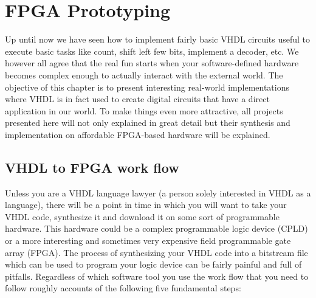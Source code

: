 \documentclass[13pt]{extreport}
\begin{document}

\renewcommand\contentsname{Table of Contents}
\tableofcontents

\chapter{FPGA Prototyping}
Up until now we have seen how to implement fairly basic VHDL circuits useful to execute basic tasks like count, shift left few bits, implement a decoder, etc. We however all agree that the real fun starts when your software-defined hardware becomes complex enough to actually interact with the external world.
The objective of this chapter is to present interesting real-world implementations where VHDL is in fact used to create digital circuits that have a direct application in our world. To make things even more attractive, all projects presented here will not only explained in great detail but their synthesis and implementation on affordable FPGA-based hardware will be explained.

\section{VHDL to FPGA work flow}
Unless you are a VHDL language lawyer (a person solely interested in VHDL as a language), there will be a point in time in which you will want to take your VHDL code, synthesize it and download it on some sort of programmable hardware. This hardware could be a complex programmable logic device (CPLD) or a more interesting and sometimes very expensive field programmable gate array (FPGA).
The process of synthesizing your VHDL code into a bitstream file which can be used to program your logic device can be fairly painful and full of pitfalls. Regardless of which software tool you use the work flow that you need to follow roughly accounts of the following five fundamental steps:
\end{document}
